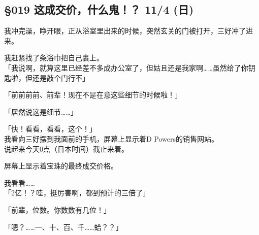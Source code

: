 \subsection{§019 这成交价，什么鬼！？ 11/4 (日)}

我冲完澡，睁开眼，正从浴室里出来的时候，突然玄关的门被打开，三好冲了进来。

我赶紧找了条浴巾把自己裹上。\\

「我说啊，就算这里已经差不多成办公室了，但姑且还是我家啊……虽然给了你钥匙啦，但还是敲个门行不」

「前前前前、前辈！现在不是在意这些细节的时候啦！」

「居然说这是细节……」

「快！看看，看看，这个！」\\

我看向三好摆到我面前的手机，屏幕上显示着D Powers的销售网站。\\

说起来今天0点（日本时间）截止来着。

屏幕上显示着宝珠的最终成交价格。

我看看……\\

「2亿！？哇，挺厉害啊，都到预计的三倍了」

「前辈，位数。你数数有几位！」

「嗯？……一、十、百、千……蛤？？」\\

